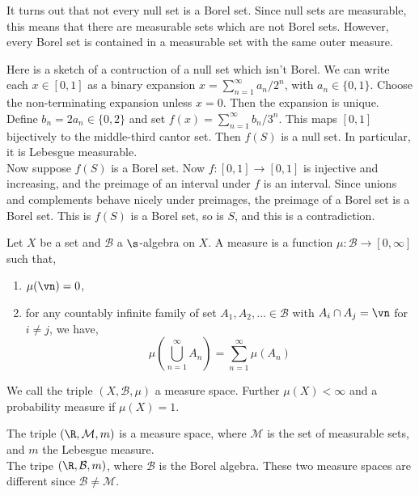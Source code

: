 \begin{remark}
   It turns out that not every null set is a Borel set. Since null sets are measurable, this means that there are measurable sets which are not Borel sets. However, every Borel set is contained in a measurable set with the same outer measure.
\end{remark}

\begin{eg}
  Here is a sketch of a contruction of a null set which isn't Borel. We can write each $x \in [0, 1]$ as a binary expansion $x = \sum_{n=1}^\infty a_n/2^n$, with $a_n \in \{0, 1\}$. Choose the non-terminating expansion unless $x = 0$. Then the expansion is unique. \\

  \noindent
  Define $b_n = 2a_n \in \{0, 2\}$ and set $f(x) =\sum_{n=1}^\infty b_n/3^n$. This maps $[0, 1]$ bijectively to the middle-third cantor set. Then $f(S)$ is a null set. In particular, it is Lebesgue measurable.\\

  \noindent
  Now suppose $f(S)$ is a Borel set. Now $f: [0, 1] \to [0, 1]$ is injective and increasing, and the preimage of an interval under $f$ is an interval. Since unions and complements behave nicely under preimages, the preimage of a Borel set is a Borel set. This is $f(S)$ is a Borel set, so is $S$, and this is a contradiction.
\end{eg}

\begin{ndefi}
  Let $X$ be a set and $\mathcal{B}$ a $\s$-algebra on $X$. A measure is a function $\mu : \mathcal{B} \to [0, \infty]$ such that,
  \begin{enumerate}
    \item $\mu(\vn) = 0$,
    \item for any countably infinite family of set $A_1, A_2, \dots \in \mathcal{B}$ with $A_i \cap A_j = \vn$ for $i \ne j$, we have,
    $$ \mu \left( \bigcup_{n=1}^\infty A_n \right) = \sum_{n=1}^\infty \mu(A_n)$$
  \end{enumerate}
  We call the triple $(X, \mathcal{B}, \mu)$ a measure space. Further $\mu(X) < \infty$ and a probability measure if $\mu(X) = 1$.
\end{ndefi}

\begin{eg}
  The triple $(\R, \mathcal{M}, m)$ is a measure space, where $\mathcal{M}$ is the set of measurable sets, and $m$ the Lebesgue measure. \\

  \noindent
  The tripe $(\R, \mathcal{B}, m)$, where $\mathcal{B}$ is the Borel algebra. These two measure spaces are different since $\mathcal{B} \ne \mathcal{M}$.
\end{eg}

